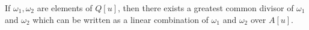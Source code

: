 If $\omega_1, \omega_2$ are elements of $Q[u]$, then there exists a greatest common divisor of $\omega_1$ and $\omega_2$ which can be written as a linear combination of $\omega_1$ and $\omega_2$ over $A[u]$.

